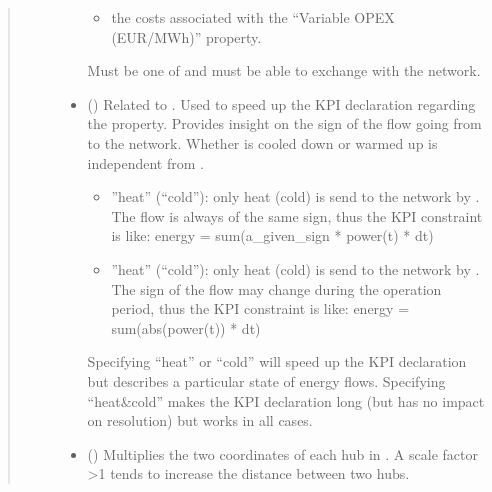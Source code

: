 \documentclass[letterpaper,10pt,english]{sphinxmanual}
\begin{document}
\begin{fulllineitems}
\begin{fulllineitems}
\begin{quote}
\begin{description}
\begin{itemize}
\begin{itemize}
\item {} 
\sphinxAtStartPar
the costs associated with the “Variable OPEX (EUR/MWh)” property.

\end{itemize}

\sphinxAtStartPar
Must be one of  and must be able to exchange  with the network.


\item {} 
\sphinxAtStartPar
{} (\sphinxstyleliteralemphasis{\sphinxupquote{, }}\sphinxstyleliteralemphasis{\sphinxupquote{, }}\sphinxstyleliteralemphasis{\sphinxupquote{, }}\sphinxstyleliteralemphasis{\sphinxupquote{, }}) \textendash{} 
\sphinxAtStartPar
Related to .
Used to speed up the KPI declaration regarding the  property.
Provides insight on the sign of the flow going from  to the network.
Whether  is cooled down or warmed up is independent from .
\begin{itemize}
\item {} 
\sphinxAtStartPar
”heat” (“cold”): only heat (cold) is send to the network by .
The flow is always of the same sign, thus the KPI constraint is like:
energy = sum(a\_given\_sign * power(t) * dt)

\item {} 
\sphinxAtStartPar
”heat” (“cold”): only heat (cold) is send to the network by .
The sign of the flow may change during the operation period, thus the KPI constraint is like:
energy = sum(abs(power(t)) * dt)

\end{itemize}

\sphinxAtStartPar
Specifying “heat” or “cold” will speed up the KPI declaration but describes a particular state of energy flows.
Specifying “heat\&cold” makes the KPI declaration long (but has no impact on resolution) but works in all cases.


\item {} 
\sphinxAtStartPar
{} (\sphinxstyleliteralemphasis{\sphinxupquote{, }}\sphinxstyleliteralemphasis{\sphinxupquote{, }}) \textendash{} Multiplies the two coordinates of each hub in .
A scale factor \textgreater{}1 tends to increase the distance between two hubs.


\end{itemize}
\end{description}
\end{quote}
\end{fulllineitems}
\end{fulllineitems}
\end{document}
